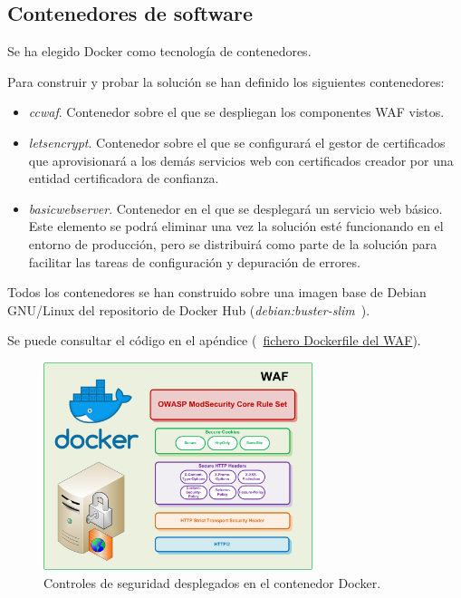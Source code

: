 \subsection{Contenedores de software}
\par Se ha elegido Docker como tecnología de contenedores.
\par Para construir y probar la solución se han definido los siguientes contenedores:
\begin{itemize}
  \item {\em ccwaf}. Contenedor sobre el que se despliegan los componentes WAF vistos.
  \item {\em letsencrypt}. Contenedor sobre el que se configurará el gestor de certificados que aprovisionará a los demás servicios web con certificados creador por una entidad certificadora de confianza.
  \item {\em basicwebserver}. Contenedor en el que se desplegará un servicio web básico. Este elemento se podrá eliminar una vez la solución esté funcionando en el entorno de producción, pero se distribuirá como parte de
    la solución para facilitar las tareas de configuración y depuración de errores.
\end{itemize}
\par Todos los contenedores se han construido sobre una imagen base de Debian GNU/Linux del repositorio de Docker Hub ({\em debian:buster-slim}~\cite{dockerhubdebian}).
\par Se puede consultar el código en el apéndice (~\hyperref[listing:ccwafDockerfile]{fichero Dockerfile del WAF}).

\begin{figure}[!ht]
  \centering
  \label{fig:Diagrama Docker WAF}
  \includegraphics[width=0.7\textwidth]{fig/Diagram_Docker_WAF}
  \caption{Controles de seguridad desplegados en el contenedor Docker.}
\end{figure}

